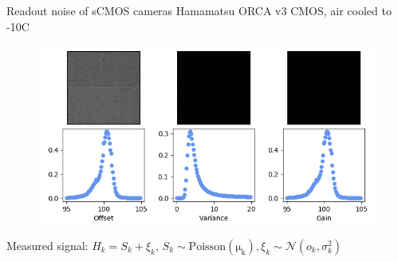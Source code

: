 \documentclass{beamer}					%
\begin{document}
\begin{frame}{Readout noise of sCMOS cameras}
Hamamatsu ORCA v3 CMOS, air cooled to -10C
\begin{figure}
\includegraphics[width=12cm]{Noise-Maps.png}
\end{figure}
Measured signal: $H_{k} = S_{k} + \xi_{k}$, $S_{k}\sim \mathrm{Poisson(\mu_{k})}, \xi_{k}\sim \mathcal{N}(o_{k},\sigma_{k}^{2})$
\end{frame}
\end{document}
